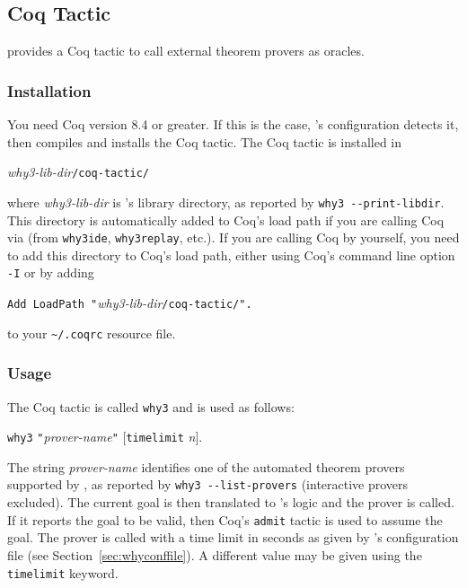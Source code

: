 \subsection{Coq Tactic}
\label{sec:coqtactic}

\why provides a Coq tactic to call external theorem provers as oracles.

\subsubsection{Installation}

You need Coq version 8.4 or greater. If this is the case, \why's
configuration detects it, then compiles and installs the Coq tactic.
The Coq tactic is installed in
\begin{center}
  \textit{why3-lib-dir}\texttt{/coq-tactic/}
\end{center}
where \textit{why3-lib-dir} is \why's library directory, as reported
by \verb+why3 --print-libdir+. This directory
is automatically added to Coq's load path if you are
calling Coq via \why (from \texttt{why3ide}, \texttt{why3replay},
etc.). If you are calling Coq by yourself, you need to add
this directory to Coq's load path, either using Coq's command line
option \texttt{-I} or by adding
\begin{center}
  \verb+Add LoadPath "+\textit{why3-lib-dir}\verb+/coq-tactic/".+
\end{center}
to your \texttt{\~{}/.coqrc} resource file.

\subsubsection{Usage}

The Coq tactic is called \texttt{why3} and is used as follows:
\begin{center}
  \texttt{why3} \verb+"+\textit{prover-name}\verb+"+
  $[$\texttt{timelimit} \textit{n}$]$.
\end{center}
The string \textit{prover-name} identifies one of the automated theorem provers
supported by \why, as reported by \verb+why3 --list-provers+
(interactive provers excluded).
The current goal is then translated to \why's logic and the prover is
called. If it reports the goal to be valid, then Coq's \texttt{admit}
tactic is used to assume the goal. The prover is called with a time
limit in seconds as given by \why's configuration file
(see Section~\ref{sec:whyconffile}). A different value may be given
using the \texttt{timelimit} keyword.

